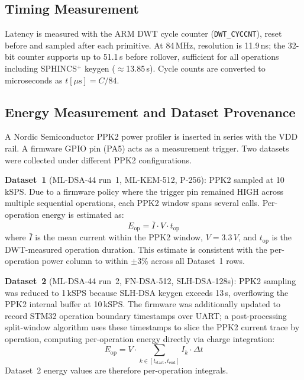 \documentclass[iicol]{sn-jnl}
\begin{document}
\subsection{Timing Measurement}

Latency is measured with the ARM DWT cycle counter
(\texttt{DWT\_CYCCNT}), reset before and sampled after each primitive.
At 84\,MHz, resolution is 11.9\,ns; the 32-bit counter
supports up to 51.1\,s before rollover, sufficient for all
operations including SPHINCS$^+$ keygen ($\approx$13.85\,s).
Cycle counts are converted to microseconds as $t[\mu\text{s}] = C / 84$.

\subsection{Energy Measurement and Dataset Provenance}
\label{sec:energy}

A Nordic Semiconductor PPK2 power profiler is inserted in series
with the VDD rail.
A firmware GPIO pin (PA5) acts as a measurement trigger.
Two datasets were collected under different PPK2 configurations.

\textbf{Dataset~1} (ML-DSA-44 run~1, ML-KEM-512, P-256):
PPK2 sampled at 10\,kSPS.
Due to a firmware policy where the trigger pin remained HIGH across
multiple sequential operations, each PPK2 window spans several calls.
Per-operation energy is estimated as:
\begin{equation}
  E_{\text{op}} = \bar{I} \cdot V \cdot t_{\text{op}}
  \label{eq:energy-est}
\end{equation}
where $\bar{I}$ is the mean current within the PPK2 window,
$V = 3.3\,V$, and $t_{\text{op}}$ is the DWT-measured operation
duration.
This estimate is consistent with the per-operation power column to within
$\pm$3\% across all Dataset~1 rows.

\textbf{Dataset~2} (ML-DSA-44 run~2, FN-DSA-512, SLH-DSA-128s):
PPK2 sampling was reduced to 1\,kSPS because SLH-DSA keygen
exceeds 13\,s, overflowing the PPK2 internal buffer at
10\,kSPS.
The firmware was additionally updated to record STM32 operation
boundary timestamps over UART; a post-processing split-window algorithm
uses these timestamps to slice the PPK2 current trace by operation,
computing per-operation energy directly via charge integration:
\begin{equation}
  E_{\text{op}} = V \cdot \sum_{k \in [t_{\text{start}}, t_{\text{end}}]}
                  I_k \cdot \Delta t
  \label{eq:energy-int}
\end{equation}
Dataset~2 energy values are therefore per-operation integrals.
\end{document}
